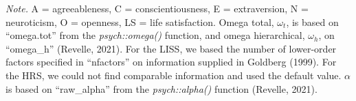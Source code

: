 \documentclass[
  english,
  man,floatsintext]{apa7}
\begin{document}
\begin{table}[h]
\begin{center}
\begin{threeparttable}
\begin{tablenotes}[para]
\normalsize{\textit{Note.} A = agreeableness, C = conscientiousness, E = extraversion, N = neuroticism, O = openness, LS = life satisfaction. Omega total, \({\omega}_{t}\), is based on \enquote{omega.tot} from the \emph{psych::omega()} function, and omega hierarchical, \({\omega}_{h}\), on \enquote{omega\_h} (Revelle, 2021). For the LISS, we based the number of lower-order factors specified in \enquote{nfactors} on information supplied in Goldberg (1999). For the HRS, we could not find comparable information and used the default value. \({\alpha}\) is based on \enquote{raw\_alpha} from the \emph{psych::alpha()} function (Revelle, 2021).}
\end{tablenotes}

\end{threeparttable}
\end{center}

\end{table}
\end{document}
